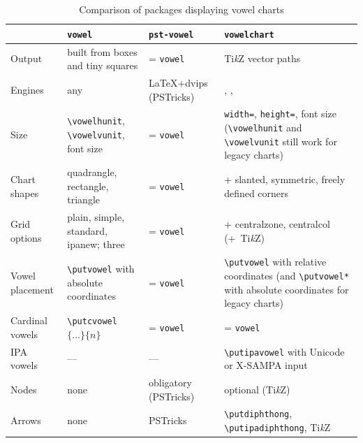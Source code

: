 \documentclass[a4paper,11pt]{article}
\newcommand\cmd[1]{\texttt{\textbackslash #1}}
\newcommand\opt[1]{\texttt{#1}}
\newcommand\pkg[1]{\texttt{#1}}
\begin{document}
\begin{table}[htbp]
	\centering\small
	\renewcommand\arraystretch{1.15}
	\begin{tabular}{@{}L{2.6cm}L{3.7cm}L{3.7cm}L{4.6cm}@{}}
		\toprule
		& \pkg{vowel} & \pkg{pst-vowel} & \pkg{vowelchart}\\
		\midrule
		Output & built from boxes and tiny squares & = \pkg{vowel} & Ti\textit{k}Z vector paths \smallskip \\
		Engines & any & \LaTeX+dvips (PSTricks) & , ,  \smallskip \\
		Size & \cmd{vowelhunit}, \cmd{vowelvunit}, font size & = \pkg{vowel} & \opt{width=}, \opt{height=}, font size (\cmd{vowelhunit} and \cmd{vowelvunit} still work for legacy charts) \smallskip \\
		Chart shapes & quadrangle, rectangle, triangle & = \pkg{vowel} & + slanted, symmetric, freely defined corners \smallskip \\
		Grid options & plain, simple, standard, ipanew; three & = \pkg{vowel} & + centralzone, centralcol (+~Ti\textit{k}Z) \smallskip \\
		Vowel placement & \cmd{putvowel} with absolute coordinates & = \pkg{vowel} & \cmd{putvowel} with relative coordinates (and \cmd{putvowel*} with absolute coordinates for legacy charts) \smallskip \\
		Cardinal vowels & \cmd{putcvowel}$\{\ldots\}\{n\}$ & = \pkg{vowel} & = \pkg{vowel} \smallskip \\
		IPA vowels & --- & --- & \cmd{putipavowel} with Unicode or \mbox{X-SAMPA} input \smallskip \\
		Nodes & none & obligatory (PSTricks) & optional (Ti\textit{k}Z) \smallskip \\
		Arrows & none & PSTricks & \cmd{putdiphthong}, \cmd{putipadiphthong}, Ti\textit{k}Z \\
		\bottomrule
	\end{tabular}
	\caption{Comparison of packages displaying vowel charts}
	\label{tab:compatibility}
\end{table}
\end{document}
